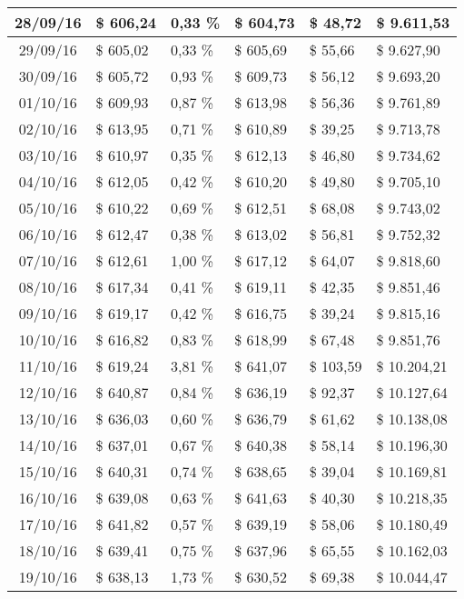 \begin{small}
\begin{longtable}{|c|l|l|l|l|l|}
28/09/16 & \$ 606,24 & 0,33 \% & \$ 604,73 & \$ 48,72 & \$ 9.611,53 \\ \hline
29/09/16 & \$ 605,02 & 0,33 \% & \$ 605,69 & \$ 55,66 & \$ 9.627,90 \\ \hline
30/09/16 & \$ 605,72 & 0,93 \% & \$ 609,73 & \$ 56,12 & \$ 9.693,20 \\ \hline
01/10/16 & \$ 609,93 & 0,87 \% & \$ 613,98 & \$ 56,36 & \$ 9.761,89 \\ \hline
02/10/16 & \$ 613,95 & 0,71 \% & \$ 610,89 & \$ 39,25 & \$ 9.713,78 \\ \hline
03/10/16 & \$ 610,97 & 0,35 \% & \$ 612,13 & \$ 46,80 & \$ 9.734,62 \\ \hline
04/10/16 & \$ 612,05 & 0,42 \% & \$ 610,20 & \$ 49,80 & \$ 9.705,10 \\ \hline
05/10/16 & \$ 610,22 & 0,69 \% & \$ 612,51 & \$ 68,08 & \$ 9.743,02 \\ \hline
06/10/16 & \$ 612,47 & 0,38 \% & \$ 613,02 & \$ 56,81 & \$ 9.752,32 \\ \hline
07/10/16 & \$ 612,61 & 1,00 \% & \$ 617,12 & \$ 64,07 & \$ 9.818,60 \\ \hline
08/10/16 & \$ 617,34 & 0,41 \% & \$ 619,11 & \$ 42,35 & \$ 9.851,46 \\ \hline
09/10/16 & \$ 619,17 & 0,42 \% & \$ 616,75 & \$ 39,24 & \$ 9.815,16 \\ \hline
10/10/16 & \$ 616,82 & 0,83 \% & \$ 618,99 & \$ 67,48 & \$ 9.851,76 \\ \hline
11/10/16 & \$ 619,24 & 3,81 \% & \$ 641,07 & \$ 103,59 & \$ 10.204,21 \\ \hline
12/10/16 & \$ 640,87 & 0,84 \% & \$ 636,19 & \$ 92,37 & \$ 10.127,64 \\ \hline
13/10/16 & \$ 636,03 & 0,60 \% & \$ 636,79 & \$ 61,62 & \$ 10.138,08 \\ \hline
14/10/16 & \$ 637,01 & 0,67 \% & \$ 640,38 & \$ 58,14 & \$ 10.196,30 \\ \hline
15/10/16 & \$ 640,31 & 0,74 \% & \$ 638,65 & \$ 39,04 & \$ 10.169,81 \\ \hline
16/10/16 & \$ 639,08 & 0,63 \% & \$ 641,63 & \$ 40,30 & \$ 10.218,35 \\ \hline
17/10/16 & \$ 641,82 & 0,57 \% & \$ 639,19 & \$ 58,06 & \$ 10.180,49 \\ \hline
18/10/16 & \$ 639,41 & 0,75 \% & \$ 637,96 & \$ 65,55 & \$ 10.162,03 \\ \hline
19/10/16 & \$ 638,13 & 1,73 \% & \$ 630,52 & \$ 69,38 & \$ 10.044,47 \\ \hline

\end{longtable}
\end{small}
